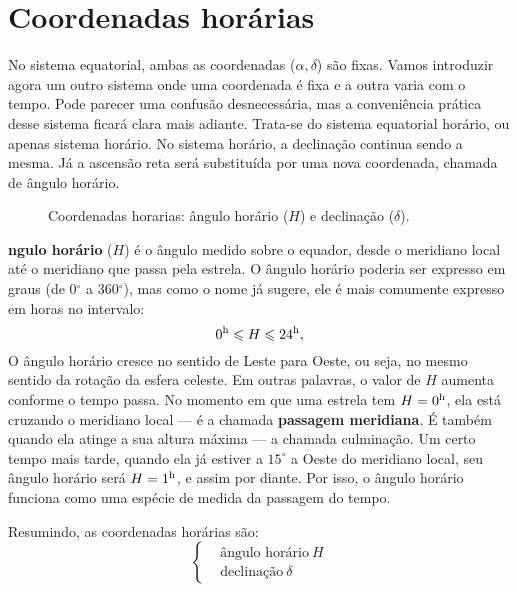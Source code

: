\newpage
\section{Coordenadas horárias}

No sistema equatorial, ambas as coordenadas ($\alpha, \delta$) são fixas. Vamos introduzir agora um outro sistema onde uma coordenada é fixa e a outra varia com o tempo. Pode parecer uma confusão desnecessária, mas a conveniência prática desse sistema ficará clara mais adiante. Trata-se do sistema equatorial horário, ou apenas sistema horário. No sistema horário, a declinação continua sendo a mesma. Já a ascensão reta será substituída por uma nova coordenada, chamada de ângulo horário.

\begin{wrapfigure}{R}{0pt}

\caption{Coordenadas horarias: ângulo horário ($H$) e declinação ($\delta$).}
\label{fig:coord-horarias}
\end{wrapfigure}

\textbf{ ngulo horário} ($H$) é o ângulo medido sobre o equador, desde o meridiano local até o meridiano que passa pela estrela. O ângulo horário poderia ser expresso em graus (de 0$^{\circ}$ a 360$^{\circ}$), mas como o nome já sugere, ele é mais comumente expresso em horas no intervalo:
%
\begin{equation}
0^{\rm h} \leqslant H \leqslant 24^{\rm h},
\end{equation}
%
O ângulo horário cresce no sentido de Leste para Oeste, ou seja, no mesmo sentido da rotação da esfera celeste. Em outras palavras, o valor de $H$ aumenta conforme o tempo passa. No momento em que uma estrela tem $H = 0^{\rm h}$, ela está cruzando o meridiano local --- é a chamada \textbf{passagem meridiana}. É também quando ela atinge a sua altura máxima --- a chamada culminação. Um certo tempo mais tarde, quando ela já estiver a $15^{\circ}$ a Oeste do meridiano local, seu ângulo horário será $H = 1^{\rm h}$, e assim por diante. Por isso, o ângulo horário funciona como uma espécie de medida da passagem do tempo.

Resumindo, as coordenadas horárias são:
%
\begin{equation*}
\left\{
\begin{aligned}
& \text{ângulo horário}~H\\
& \text{declinação}~\delta
\end{aligned}
\right.
\end{equation*}

